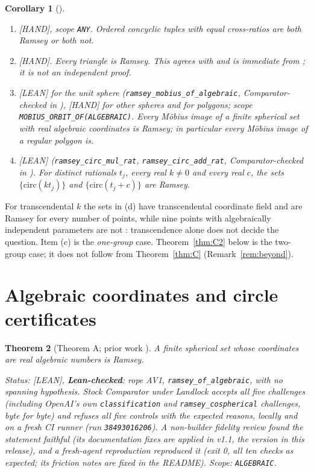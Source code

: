 \documentclass[11pt]{amsart}
\newcommand{\st}[1]{\textsf{[#1]}}
\newcommand{\circmap}{\mathrm{circ}}
\theoremstyle{plain}
\newtheorem{theorem}{Theorem}[section]
\newtheorem{corollary}[theorem]{Corollary}
\theoremstyle{definition}
\begin{document}
\begin{corollary}[{\cite[Cor.~1]{MR}}]\label{cor:mobius}
\begin{enumerate}
\item[(a)] \st{HAND}, scope \texttt{ANY}. Ordered concyclic tuples with equal cross-ratios are both
Ramsey or both not.
\item[(b)] \st{HAND}. Every triangle is Ramsey. This agrees with \cite{FR86} and is immediate from
\cite[Cor.~7.4]{OAI172}; it is not an independent proof.
\item[(c)] \st{LEAN} for the unit sphere (\texttt{ramsey\_mobius\_of\_algebraic},
Comparator-checked in \cite{MR}), \st{HAND} for other spheres and for polygons; scope
\texttt{MOBIUS\_ORBIT\_OF(ALGEBRAIC)}. Every M\"obius image of a finite spherical set with real
algebraic coordinates is Ramsey; in particular every M\"obius image of a regular polygon is.
\item[(d)] \st{LEAN} (\texttt{ramsey\_circ\_mul\_rat}, \texttt{ramsey\_circ\_add\_rat},
Comparator-checked in \cite{MR}). For distinct rationals $t_j$, every real $k\ne0$ and every real
$c$, the sets $\{\circmap(kt_j)\}$ and $\{\circmap(t_j+c)\}$ are Ramsey.
\end{enumerate}
\end{corollary}

For transcendental $k$ the sets in (d) have transcendental coordinate field and are Ramsey for every
number of points, while nine points with algebraically independent parameters are not
\cite[Prop.~7.6]{OAI172}: transcendence alone does not decide the question. Item (c) is the
\emph{one-group} case. Theorem~\ref{thm:C2} below is the two-group case; it does not follow from
Theorem~\ref{thm:C} (Remark~\ref{rem:beyond}).

\section{Algebraic coordinates and circle certificates}\label{sec:algebraic}

\begin{theorem}[Theorem A; prior work \cite{JDJones,Rogerhu,Atimics,Eliott}]\label{thm:A}
A finite spherical set whose coordinates are real algebraic numbers is Ramsey.

\smallskip\noindent\emph{Status:} \st{LEAN}, \textbf{Lean-checked}: rope AV1,
\texttt{ramsey\_of\_algebraic}, with no spanning hypothesis. Stock Comparator under Landlock accepts
all five challenges (including OpenAI's own \texttt{classification} and \texttt{ramsey\_cospherical}
challenges, byte for byte) and refuses all five controls with the expected reasons, locally and on a
fresh CI runner (run \texttt{38493016206}). A non-builder fidelity review found the statement
faithful (its documentation fixes are applied in v1.1, the version in this release), and a
fresh-agent reproduction reproduced it (exit 0, all ten checks as expected; its friction notes are
fixed in the README). Scope:
\texttt{ALGEBRAIC}.
\end{theorem}
\end{document}

